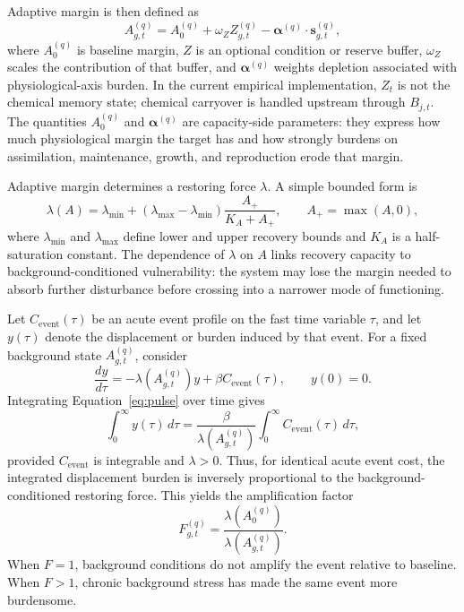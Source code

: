 Adaptive margin is then defined as
\begin{equation}
  A^{(q)}_{g,t}
  = A^{(q)}_0 + \omega_Z Z^{(q)}_{g,t}
  - \bm{\alpha}^{(q)}\cdot \mathbf{s}^{(q)}_{g,t},
  \label{eq:A}
\end{equation}
where $A^{(q)}_0$ is baseline margin, $Z$ is an optional condition or reserve buffer, $\omega_Z$ scales the contribution of that buffer, and $\bm{\alpha}^{(q)}$ weights depletion associated with physiological-axis burden. In the current empirical implementation, $Z_t$ is not the chemical memory state; chemical carryover is handled upstream through $B_{j,t}$. The quantities $A_0^{(q)}$ and $\bm{\alpha}^{(q)}$ are capacity-side parameters: they express how much physiological margin the target has and how strongly burdens on assimilation, maintenance, growth, and reproduction erode that margin.

Adaptive margin determines a restoring force $\lambda$. A simple bounded form is
\begin{equation}
  \lambda(A) = \lambda_{\min} + (\lambda_{\max}-\lambda_{\min})
  \frac{A_+}{K_A + A_+},
  \qquad A_+ = \max(A,0),
  \label{eq:lambda}
\end{equation}
where $\lambda_{\min}$ and $\lambda_{\max}$ define lower and upper recovery bounds and $K_A$ is a half-saturation constant. The dependence of $\lambda$ on $A$ links recovery capacity to background-conditioned vulnerability: the system may lose the margin needed to absorb further disturbance before crossing into a narrower mode of functioning.

Let $C_{\mathrm{event}}(\tau)$ be an acute event profile on the fast time variable $\tau$, and let $y(\tau)$ denote the displacement or burden induced by that event. For a fixed background state $A_{g,t}^{(q)}$, consider
\begin{equation}
  \frac{dy}{d\tau} = -\lambda(A^{(q)}_{g,t})y
  + \beta C_{\mathrm{event}}(\tau),
  \qquad y(0)=0.
  \label{eq:pulse}
\end{equation}
Integrating Equation~\eqref{eq:pulse} over time gives
\begin{equation}
  \int_0^\infty y(\tau)\,d\tau
  =
  \frac{\beta}{\lambda(A^{(q)}_{g,t})}
  \int_0^\infty C_{\mathrm{event}}(\tau)\,d\tau,
  \label{eq:auc}
\end{equation}
provided $C_{\mathrm{event}}$ is integrable and $\lambda>0$. Thus, for identical acute event cost, the integrated displacement burden is inversely proportional to the background-conditioned restoring force. This yields the amplification factor
\begin{equation}
  F^{(q)}_{g,t}
  =
  \frac{\lambda(A^{(q)}_0)}
       {\lambda(A^{(q)}_{g,t})}.
  \label{eq:F}
\end{equation}
When $F=1$, background conditions do not amplify the event relative to baseline. When $F>1$, chronic background stress has made the same event more burdensome.

